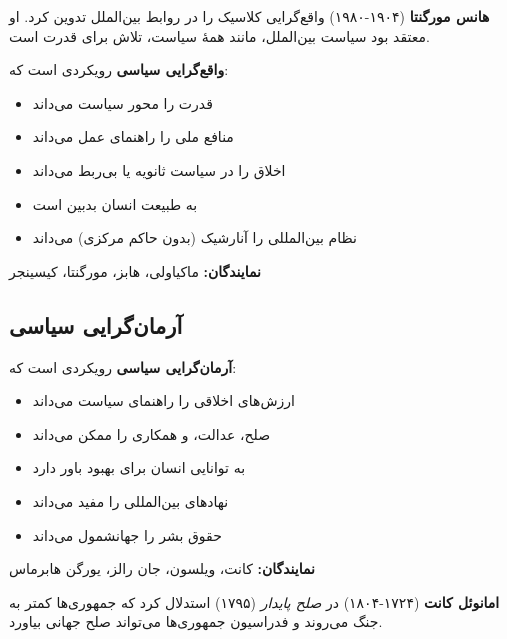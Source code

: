 \textbf{هانس مورگنتا} (۱۹۰۴-۱۹۸۰) واقع‌گرایی کلاسیک را در روابط بین‌الملل تدوین کرد. او معتقد بود سیاست بین‌الملل، مانند همهٔ سیاست، تلاش برای قدرت است.

\begin{tcolorbox}[
    enhanced,
    colback=rightblue!8,
    colframe=rightblue,
    boxrule=1.5pt,
    arc=5pt,
    fonttitle=\bfseries,
    title={\rl{🔵 تعریف: واقع‌گرایی سیاسی}}
]
\textbf{واقع‌گرایی سیاسی} رویکردی است که:
\begin{itemize}[nosep=true]
    \item قدرت را محور سیاست می‌داند
    \item منافع ملی را راهنمای عمل می‌داند
    \item اخلاق را در سیاست ثانویه یا بی‌ربط می‌داند
    \item به طبیعت انسان بدبین است
    \item نظام بین‌المللی را آنارشیک (بدون حاکم مرکزی) می‌داند
\end{itemize}

\textbf{نمایندگان:} ماکیاولی، هابز، مورگنتا، کیسینجر
\end{tcolorbox}

\subsection{آرمان‌گرایی سیاسی}

\begin{tcolorbox}[
    enhanced,
    colback=centergreen!8,
    colframe=centergreen,
    boxrule=1.5pt,
    arc=5pt,
    fonttitle=\bfseries,
    title={\rl{🟢 تعریف: آرمان‌گرایی سیاسی}}
]
\textbf{آرمان‌گرایی سیاسی} رویکردی است که:
\begin{itemize}
    \item ارزش‌های اخلاقی را راهنمای سیاست می‌داند
    \item صلح، عدالت، و همکاری را ممکن می‌داند
    \item به توانایی انسان برای بهبود باور دارد
    \item نهادهای بین‌المللی را مفید می‌داند
    \item حقوق بشر را جهانشمول می‌داند
\end{itemize}

\textbf{نمایندگان:} کانت، ویلسون، جان رالز، یورگن هابرماس
\end{tcolorbox}


\textbf{امانوئل کانت} (۱۷۲۴-۱۸۰۴) در \textit{صلح پایدار} (۱۷۹۵) استدلال کرد که جمهوری‌ها کمتر به جنگ می‌روند و فدراسیون جمهوری‌ها می‌تواند صلح جهانی بیاورد.

